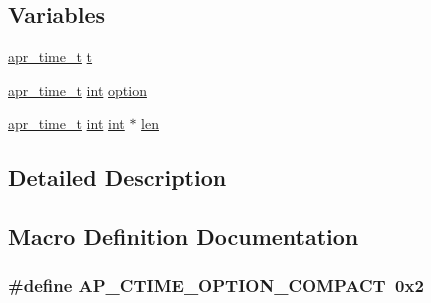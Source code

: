 \subsection*{Variables}
\begin{DoxyCompactItemize}
\item 
\hyperlink{group__apr__time_gadb4bde16055748190eae190c55aa02bb}{apr\+\_\+time\+\_\+t} \hyperlink{group__APACHE__CORE__TIME_gabfa74bb4f05f3b2de1a89160025e5400}{t}
\item 
\hyperlink{group__apr__time_gadb4bde16055748190eae190c55aa02bb}{apr\+\_\+time\+\_\+t} \hyperlink{pcre_8txt_a42dfa4ff673c82d8efe7144098fbc198}{int} \hyperlink{group__APACHE__CORE__TIME_ga737bdf2e23a8aca3ce89e79e9df35b3e}{option}
\item 
\hyperlink{group__apr__time_gadb4bde16055748190eae190c55aa02bb}{apr\+\_\+time\+\_\+t} \hyperlink{pcre_8txt_a42dfa4ff673c82d8efe7144098fbc198}{int} \hyperlink{pcre_8txt_a42dfa4ff673c82d8efe7144098fbc198}{int} $\ast$ \hyperlink{group__APACHE__CORE__TIME_gaf3fc1ce4e2ee79aa8af6cabf3f3340ef}{len}
\end{DoxyCompactItemize}


\subsection{Detailed Description}


\subsection{Macro Definition Documentation}
\subsubsection[{\texorpdfstring{A\+P\+\_\+\+C\+T\+I\+M\+E\+\_\+\+O\+P\+T\+I\+O\+N\+\_\+\+C\+O\+M\+P\+A\+CT}{AP_CTIME_OPTION_COMPACT}}]{\setlength{\rightskip}{0pt plus 5cm}\#define A\+P\+\_\+\+C\+T\+I\+M\+E\+\_\+\+O\+P\+T\+I\+O\+N\+\_\+\+C\+O\+M\+P\+A\+CT~0x2}\hypertarget{group__APACHE__CORE__TIME_gadaa484ceea6b719546b9db9ea6cf5810}{}\label{group__APACHE__CORE__TIME_gadaa484ceea6b719546b9db9ea6cf5810}
